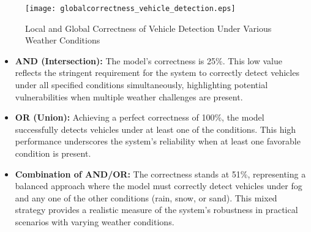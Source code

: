 
\begin{figure}[h]
  \centering
  \texttt{[image: globalcorrectness\_vehicle\_detection.eps]}
  \caption{Local and Global Correctness of Vehicle Detection Under Various Weather Conditions}
  \label{fig:global_correctness_vehicle_detection}
\end{figure}




\begin{itemize}
    \item \textbf{AND (Intersection):} The model's correctness is 25\%. This low value reflects the stringent requirement for the system to correctly detect vehicles under all specified conditions simultaneously, highlighting potential vulnerabilities when multiple weather challenges are present.
    \item \textbf{OR (Union):} Achieving a perfect correctness of 100\%, the model successfully detects vehicles under at least one of the conditions. This high performance underscores the system's reliability when at least one favorable condition is present.
    \item \textbf{Combination of AND/OR:} The correctness stands at 51\%, representing a balanced approach where the model must correctly detect vehicles under fog and any one of the other conditions (rain, snow, or sand). This mixed strategy provides a realistic measure of the system's robustness in practical scenarios with varying weather conditions.
\end{itemize}



\newpage

